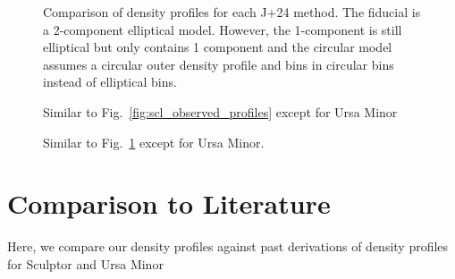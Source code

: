 \begin{figure}
\centering
{}
\caption[Scl density methods]{Comparison of density profiles for each
J+24 method. The fiducial is a 2-component elliptical model. However,
the 1-component is still elliptical but only contains 1 component and
the circular model assumes a circular outer density profile and bins in
circular bins instead of elliptical
bins.}\label{fig:scl_density_j24_methods}
\end{figure}

\begin{figure}
\centering
{}
\caption[UMi density comparison]{Similar to
Fig.~\ref{fig:scl_observed_profiles} except for Ursa
Minor}\label{fig:umi_density_extras}
\end{figure}

\begin{figure}
\centering
{}
\caption[UMi density methods]{Similar to
Fig.~\ref{fig:scl_density_j24_methods} except for Ursa
Minor.}\label{fig:umi_density_j24_methods}
\end{figure}

\section{Comparison to Literature}\label{comparison-to-literature}

Here, we compare our density profiles against past derivations of
density profiles for Sculptor and Ursa Minor
